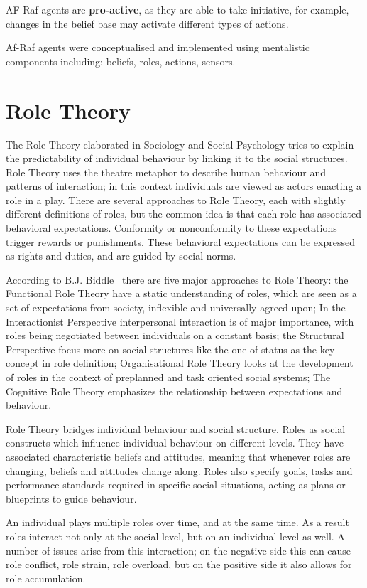 \documentclass[a4paper,12pt,oneside,fleqn]{book} %
\begin{document}
AF-Raf agents are \textbf{pro-active}, as they are able to take initiative,
for example, changes in the belief base may activate different types of
actions.

Af-Raf agents were conceptualised and implemented using mentalistic
components including: beliefs, roles, actions, sensors.
\chapter{Role Theory} %

The Role Theory elaborated in Sociology and Social Psychology tries to
explain the predictability of individual behaviour by linking it to the
social structures. Role Theory uses the theatre metaphor to describe human
behaviour and patterns of interaction; in this context individuals are
viewed as actors enacting a role in a play. There are several approaches to
Role Theory, each with slightly different definitions of roles, but the
common idea is that each role has associated behavioral expectations.
Conformity or nonconformity to these expectations trigger rewards or
punishments. These behavioral expectations can be expressed as rights and
duties, and are guided by social norms.

According to B.J. Biddle~\cite{biddle1986recent} there are five major
approaches to Role Theory: the Functional Role Theory have a static
understanding of roles, which are seen as a set of expectations from society, inflexible and universally agreed upon; In the Interactionist
Perspective interpersonal interaction is of major importance, with roles being
negotiated between individuals on a constant basis; the Structural
Perspective focus more on social structures like the one of status as the
key concept in role definition; Organisational Role Theory looks at the
development of roles in the context of preplanned and task oriented social
systems; The Cognitive Role Theory emphasizes the relationship between
expectations and behaviour.

Role Theory bridges individual behaviour and social structure. Roles as
social constructs which influence individual behaviour on different levels. They
have associated characteristic beliefs and attitudes, meaning that whenever
roles are changing, beliefs and attitudes change along. Roles also specify
goals, tasks and performance standards required in specific social
situations, acting as plans or blueprints to guide behaviour.

An individual plays multiple roles over time, and at the same time. As a
result roles interact not only at the social level, but on an individual
level as well. A number of issues arise from this interaction; on the
negative side this can cause role conflict, role strain, role overload, but
on the positive side it also allows for role accumulation.
\end{document}
